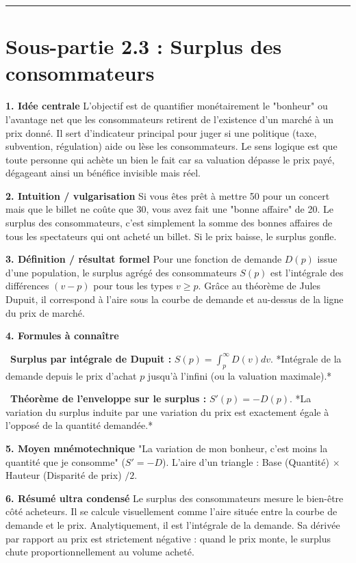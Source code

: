 \documentclass[11pt, a4paper]{report}
\begin{document}
\vspace{1cm}\hrule\vspace{1cm}

\section{Sous-partie 2.3 : Surplus des consommateurs}

\textbf{1. Idée centrale}
L'objectif est de quantifier monétairement le "bonheur" ou l'avantage net que les consommateurs retirent de l'existence d'un marché à un prix donné. Il sert d'indicateur principal pour juger si une politique (taxe, subvention, régulation) aide ou lèse les consommateurs. Le sens logique est que toute personne qui achète un bien le fait car sa valuation dépasse le prix payé, dégageant ainsi un bénéfice invisible mais réel.

\textbf{2. Intuition / vulgarisation}
Si vous êtes prêt à mettre 50\texteuro{} pour un concert mais que le billet ne coûte que 30\texteuro{}, vous avez fait une "bonne affaire" de 20\texteuro{}. Le surplus des consommateurs, c'est simplement la somme des bonnes affaires de tous les spectateurs qui ont acheté un billet. Si le prix baisse, le surplus gonfle.

\textbf{3. Définition / résultat formel}
Pour une fonction de demande $D(p)$ issue d'une population, le surplus agrégé des consommateurs $S(p)$ est l'intégrale des différences $(v-p)$ pour tous les types $v \ge p$.
Grâce au théorème de Jules Dupuit, il correspond à l'aire sous la courbe de demande et au-dessus de la ligne du prix de marché.

\textbf{4. Formules à connaître}
\par \textbullet\ \textbf{Surplus par intégrale de Dupuit :} $S(p) = \int_p^\infty D(v) dv$. *Intégrale de la demande depuis le prix d'achat $p$ jusqu'à l'infini (ou la valuation maximale).*
\par \textbullet\ \textbf{Théorème de l'enveloppe sur le surplus :} $S'(p) = -D(p)$. *La variation du surplus induite par une variation du prix est exactement égale à l'opposé de la quantité demandée.*

\textbf{5. Moyen mnémotechnique}
"La variation de mon bonheur, c'est moins la quantité que je consomme" ($S' = -D$). L'aire d'un triangle : Base (Quantité) $\times$ Hauteur (Disparité de prix) $/ 2$.

\textbf{6. Résumé ultra condensé}
Le surplus des consommateurs mesure le bien-être côté acheteurs. Il se calcule visuellement comme l'aire située entre la courbe de demande et le prix. Analytiquement, il est l'intégrale de la demande. Sa dérivée par rapport au prix est strictement négative : quand le prix monte, le surplus chute proportionnellement au volume acheté.
\end{document}

